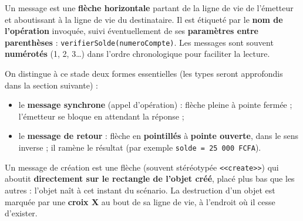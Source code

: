 \documentclass[11pt]{article}
\newcommand{\cle}[1]{{\popxbold\color{popdark}#1}}
\newcounter{popsec}
\newcounter{popsub}
\newcommand{\courssub}[1]{%
  \stepcounter{popsub}%
  \par\vspace{9pt}\noindent{\popxbold\fontsize{11.5}{13}\selectfont\color{popink}{\color{poporange}\thepopsec.\thepopsub}\hspace{6pt}#1}\par\nopagebreak\vspace{4pt}
}
\begin{document}
\courssub{Les messages}

\begin{definition}[Message]
Un \cle{message} est une \textbf{flèche horizontale} partant de la ligne de vie de l'émetteur et aboutissant à la ligne de vie du destinataire. Il est étiqueté par le \textbf{nom de l'opération} invoquée, suivi éventuellement de ses \textbf{paramètres entre parenthèses} : \texttt{verifierSolde(numeroCompte)}. Les messages sont souvent \textbf{numérotés} (1, 2, 3\ldots) dans l'ordre chronologique pour faciliter la lecture.
\end{definition}

On distingue à ce stade deux formes essentielles (les types seront approfondis dans la section suivante) :
\begin{itemize}
\item le \textbf{message synchrone} (appel d'opération) : flèche pleine à pointe fermée ; l'émetteur se bloque en attendant la réponse ;
\item le \textbf{message de retour} : flèche en \textbf{pointillés} à \textbf{pointe ouverte}, dans le sens inverse ; il ramène le résultat (par exemple \texttt{solde = 25 000 FCFA}).
\end{itemize}

\begin{propriete}
Un \cle{message de création} est une flèche (souvent stéréotypée \texttt{<<create>>}) qui aboutit \textbf{directement sur le rectangle de l'objet créé}, placé plus bas que les autres : l'objet naît à cet instant du scénario. La \cle{destruction} d'un objet est marquée par une \textbf{croix X} au bout de sa ligne de vie, à l'endroit où il cesse d'exister.
\end{propriete}
\end{document}
